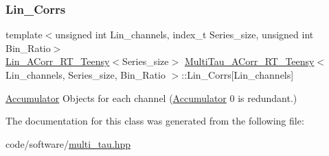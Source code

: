 \subsubsection{\texorpdfstring{Lin\+\_\+\+Corrs}{Lin\_Corrs}}
{\footnotesize\ttfamily template$<$unsigned int Lin\+\_\+channels, index\+\_\+t Series\+\_\+size, unsigned int Bin\+\_\+\+Ratio$>$ \\
\hyperlink{classLin__ACorr__RT__Teensy}{Lin\+\_\+\+A\+Corr\+\_\+\+R\+T\+\_\+\+Teensy}$<$Series\+\_\+size$>$ \hyperlink{classMultiTau__ACorr__RT__Teensy}{Multi\+Tau\+\_\+\+A\+Corr\+\_\+\+R\+T\+\_\+\+Teensy}$<$ Lin\+\_\+channels, Series\+\_\+size, Bin\+\_\+\+Ratio $>$\+::Lin\+\_\+\+Corrs\mbox{[}Lin\+\_\+channels\mbox{]}\hspace{0.3cm}{\ttfamily [private]}}



\hyperlink{classAccumulator}{Accumulator} Objects for each channel (\hyperlink{classAccumulator}{Accumulator} \textquotesingle{}0\textquotesingle{} is redundant.) 



The documentation for this class was generated from the following file\+:\begin{DoxyCompactItemize}
\item 
code/software/\hyperlink{multi__tau_8hpp}{multi\+\_\+tau.\+hpp}\end{DoxyCompactItemize}
